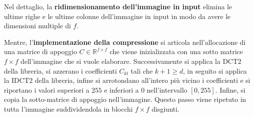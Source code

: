 Nel dettaglio, la \textbf{ridimensionamento dell'immagine in input} elimina le ultime
righe e le ultime colonne dell'immagine in input in modo da avere le dimensioni
multiple di $f$.

Mentre, l'\textbf{implementazione della compressione} si articola nell'allocazione
di una matrice di appoggio $C\in \mathbb{R}^{f\times f}$ che viene inizializzata
con una sotto matrice $f\times f$ dell'immagine che si vuole elaborare. Successivamente
si applica la DCT2 della libreria, si azzerano i coefficienti $C_{kl}$ tali che
$k+1\ge d$, in seguito si applica la IDCT2 della libreria, infine si arrotondano
all'intero più vicino i coefficienti e si riportano i valori superiori a $255$
e inferiori a $0$ nell'intervallo $[0,255]$. Infine, si copia la sotto-matrice di
appoggio nell'immagine. Questo passo viene ripetuto in tutta l'immagine suddividendola
in blocchi $f\times f$ disgiunti.